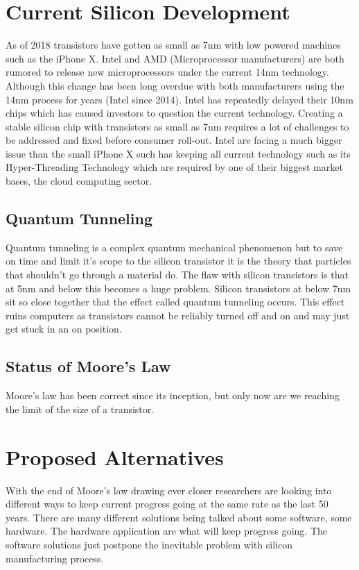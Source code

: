 \documentclass[journal]{IEEEtran}
\begin{document}
\section{Current Silicon Development}
As of 2018 transistors have gotten as small as 7nm with low powered machines such as the iPhone X. Intel and AMD (Microprocessor manufacturers) are both rumored to release new microprocessors under the current 14nm technology. Although this change has been long overdue with both manufacturers using the 14nm process for years (Intel since 2014). Intel has repeatedly delayed their 10nm chips \cite{dent_2018} which has caused investors to question the current technology. Creating a stable silicon chip with transistors as small as 7nm requires a lot of challenges to be addressed and fixed before consumer roll-out. Intel are facing a much bigger issue than the small iPhone X such has keeping all current technology such as its Hyper-Threading Technology which are required by one of their biggest market bases, the cloud computing sector. 

\subsection{Quantum Tunneling}
Quantum tunneling is a complex quantum mechanical phenomenon \cite{70394920140101} but to save on time and limit it's scope to the silicon transistor it is the theory that particles that shouldn't go through a material do. The flaw with silicon transistors is that at 5nm and below this becomes a huge problem. Silicon transistors at below 7nm sit so close together that the effect called quantum tunneling occurs. This effect ruins computers as transistors cannot be reliably turned off and on and may just get stuck in an on position.

\subsection{Status of Moore's Law}
Moore's law has been correct since its inception, but only now are we reaching the limit of the size of a transistor. 

\section{Proposed Alternatives}
With the end of Moore's law drawing ever closer researchers are looking into different ways to keep current progress going at the same rate as the last 50 years. There are many different solutions being talked about some software, some hardware. The hardware application are what will keep progress going. The software solutions just postpone the inevitable problem with silicon manufacturing process.
\end{document}
